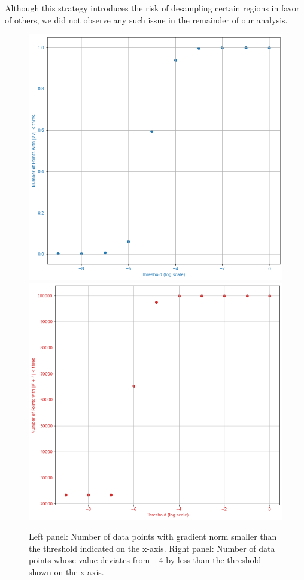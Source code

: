 \documentclass[11pt]{article}
\begin{document}
		Although this strategy introduces the risk of desampling certain regions in favor of others, we did not observe any such issue in the remainder of our analysis.
		
		\begin{figure}
			\centering
			\includegraphics[scale=0.35]{Figures/nabla_V_thres.png}
			\quad
			\includegraphics[scale=0.35]{Figures/V_values_thres.png}
			\caption{Left panel: Number of data points with gradient norm smaller than the threshold indicated on the x-axis. Right panel: Number of data points whose value deviates from $-4$ by less than the threshold shown on the x-axis.}
			\label{fig:Analyze_V_points}
		\end{figure}
		
\end{document}
